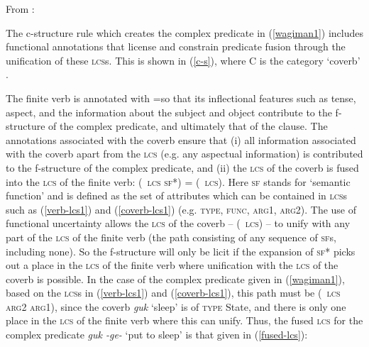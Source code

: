 \documentclass[output=paper,hidelinks]{langscibook}
\begin{document}
\ea
\label{coverb-lcs1}
From \citet[147: example (39)]{Wilson1999}:\\
\z

The c-structure rule which creates the complex predicate in (\ref{wagiman1}) includes functional annotations that license and constrain predicate fusion through the unification of these \textsc{lcs}s. This is shown in (\ref{c-s}), where C is the category `coverb' \citep[144]{Wilson1999}. 

\ea
\label{c-s}
\z

The finite verb is annotated with \UP=\DOWN so that its inflectional features such as tense, aspect, and the information about the subject and object contribute to the f-structure of the complex predicate, and ultimately that of the clause.  The annotations associated with the coverb ensure that (i) all information associated with the coverb apart from the \textsc{lcs} (e.g. any aspectual information) is contributed to the f-structure of the complex predicate, and (ii) the \textsc{lcs} of the coverb is fused into the \textsc{lcs} of the finite verb: (\UP\ \textsc{lcs sf*}) = (\DOWN\ \textsc{lcs}). Here \textsc{sf} stands for `semantic function' and is defined as the set of attributes which can be contained in \textsc{lcs}s such as (\ref{verb-lcs1}) and (\ref{coverb-lcs1}) (e.g. \textsc{type, func, arg1, arg2}). The use of functional uncertainty allows the \textsc{lcs} of the coverb -- (\DOWN\ \textsc{lcs}) -- to unify with any part of the \textsc{lcs} of the finite verb (the path consisting of any sequence of \textsc{sf}s, including none). So the f-structure will only be licit if the expansion of \textsc{sf}* picks out a place in the \textsc{lcs} of the finite verb where unification with the \textsc{lcs} of the coverb is possible.  In the case of the complex predicate given in (\ref{wagiman1}), based on the \textsc{lcs}s in (\ref{verb-lcs1}) and (\ref{coverb-lcs1}), this path must be (\UP\ \textsc{lcs arg2 arg1}), since the coverb {\it guk} `sleep' is of \textsc{type} State, and there is only one place in the \textsc{lcs} of the finite verb where this can unify.  Thus, the fused \textsc{lcs} for the complex predicate {\it guk -ge-} `put to sleep' is that given in (\ref{fused-lcs}):
\end{document}
